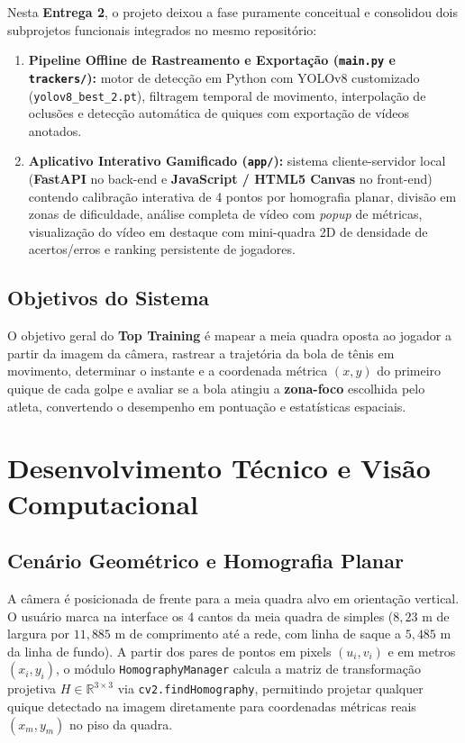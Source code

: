 \documentclass[a4paper,11pt]{article}
\begin{document}
Nesta \textbf{Entrega 2}, o projeto deixou a fase puramente conceitual e consolidou dois subprojetos funcionais integrados no mesmo repositório:
\begin{enumerate}[nosep]
  \item \textbf{Pipeline Offline de Rastreamento e Exportação (\texttt{main.py} e \texttt{trackers/}):} motor de detecção em Python com YOLOv8 customizado (\texttt{yolov8\_best\_2.pt}), filtragem temporal de movimento, interpolação de oclusões e detecção automática de quiques com exportação de vídeos anotados.
  \item \textbf{Aplicativo Interativo Gamificado (\texttt{app/}):} sistema cliente-servidor local (\textbf{FastAPI} no back-end e \textbf{JavaScript / HTML5 Canvas} no front-end) contendo calibração interativa de 4 pontos por homografia planar, divisão em zonas de dificuldade, análise completa de vídeo com \textit{popup} de métricas, visualização do vídeo em destaque com mini-quadra 2D de densidade de acertos/erros e ranking persistente de jogadores.
\end{enumerate}

\subsection{Objetivos do Sistema}
O objetivo geral do \textbf{Top Training} é mapear a meia quadra oposta ao jogador a partir da imagem da câmera, rastrear a trajetória da bola de tênis em movimento, determinar o instante e a coordenada métrica $(x, y)$ do primeiro quique de cada golpe e avaliar se a bola atingiu a \textbf{zona-foco} escolhida pelo atleta, convertendo o desempenho em pontuação e estatísticas espaciais.

\section{Desenvolvimento Técnico e Visão Computacional}

\subsection{Cenário Geométrico e Homografia Planar}
A câmera é posicionada de frente para a meia quadra alvo em orientação vertical. O usuário marca na interface os 4 cantos da meia quadra de simples ($8{,}23\text{ m}$ de largura por $11{,}885\text{ m}$ de comprimento até a rede, com linha de saque a $5{,}485\text{ m}$ da linha de fundo). A partir dos pares de pontos em pixels $(u_i, v_i)$ e em metros $(x_i, y_i)$, o módulo \texttt{HomographyManager} calcula a matriz de transformação projetiva $H \in \mathbb{R}^{3\times 3}$ via \texttt{cv2.findHomography}, permitindo projetar qualquer quique detectado na imagem diretamente para coordenadas métricas reais $(x_m, y_m)$ no piso da quadra.
\end{document}
